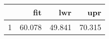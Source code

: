 \begin{table}[ht]
\centering
\begin{tabular}{rrrr}
  \hline
 & fit & lwr & upr \\ 
  \hline
1 & 60.078 & 49.841 & 70.315 \\ 
   \hline
\end{tabular}
\end{table}
